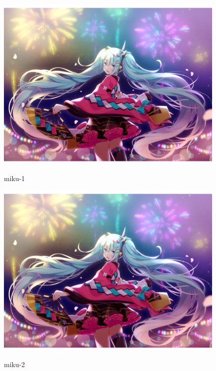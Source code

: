 \documentclass[UTF8]{ctexart}
\begin{document}

	\begin{figure}[htbp]
		\begin{minipage}[b]    {15em}
			\centering
			{\includegraphics[scale=0.4]{figures/miku-01.png}}
			\caption{miku-1}
		\end{minipage}
		\qquad
		\begin{minipage}[b]{15em}
			\centering
			{\includegraphics[scale=0.4]{figures/miku-01.png}}
			\caption{miku-2}
		\end{minipage}
	\end{figure}

\end{document}
